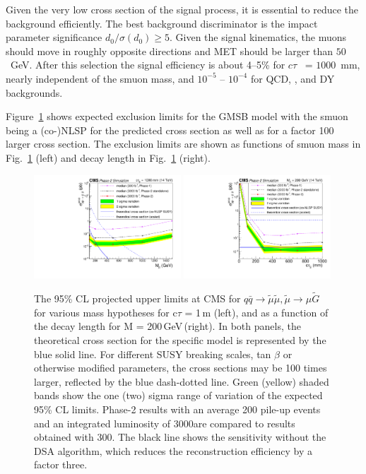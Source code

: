Given the very low cross section of the signal process, 
it is essential to reduce the background efficiently. The best background discriminator 
is the impact parameter significance $d_0 / \sigma (d_0) \geq 5$.
Given the signal kinematics, the muons should move in roughly opposite directions
and MET should be larger than $50$~GeV. 
After this selection the signal efficiency is about 4--5\% for $c\tau$~ = $1000$~mm, 
nearly independent of the smuon mass, 
and $10^{-5}$ -- $10^{-4}$ for QCD, \ttbar, and DY backgrounds.

Figure~\ref{fig:displResults} shows expected exclusion limits for the GMSB model with the smuon being a (co-)NLSP for the predicted cross section as well as for a factor 100 larger cross section. The exclusion limits are shown as functions of smuon mass in  Fig.~\ref{fig:displResults} (left) and decay length in Fig.~\ref{fig:displResults} (right).

\begin{figure}[t]\begin{center}
\includegraphics[width=0.49\textwidth]{figures/LimitComparison_withStandAloneEff.pdf}
\includegraphics[width=0.49\textwidth]{figures/LimitComparison_asfuncofCtau.pdf}
\caption{The 95\% CL projected upper limits at CMS for  $q \bar q \to \widetilde{\mu} \widetilde{\mu}, \widetilde{\mu}\rightarrow \mu\widetilde{G}$ 
for various mass hypotheses for c$\tau$ = 1\,m (left), and as a function of the decay length for M = 200\,GeV\,(right).
In both panels, the theoretical cross section for the specific model is represented by the blue solid line.
For different SUSY breaking scales, tan $\beta$ or otherwise modified parameters, the cross sections may be  100 times larger, reflected by the blue dash-dotted line.
Green (yellow) shaded bands show the one (two) sigma range of variation of the expected 95\% CL limits. Phase-2 results with an average 200 pile-up events and an integrated luminosity of 3000\fbinv are compared to results obtained with 300\fbinv. The black line shows the sensitivity without the DSA algorithm, which reduces the reconstruction efficiency by a factor three.
 }
\label{fig:displResults}
\end{center}
\end{figure}

